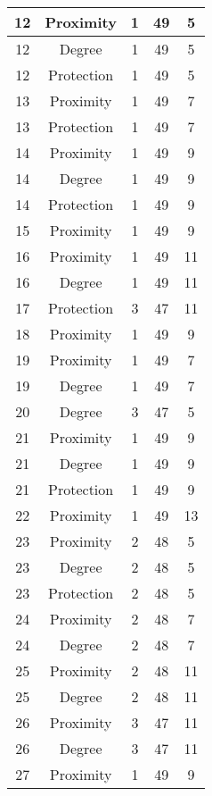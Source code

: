 \documentclass[results.tex]{subfiles}
\begin{document}
\begin{center}
\begin{tabular}{| c || c | c | c | c |}
    \hline
    12 & Proximity & 1 & 49 & 5 \\ 
    \hline
    12 & Degree & 1 & 49 & 5 \\ 
    \hline
    12 & Protection & 1 & 49 & 5 \\ 
    \hline
    13 & Proximity & 1 & 49 & 7 \\ 
    \hline
    13 & Protection & 1 & 49 & 7 \\ 
    \hline
    14 & Proximity & 1 & 49 & 9 \\ 
    \hline
    14 & Degree & 1 & 49 & 9 \\ 
    \hline
    14 & Protection & 1 & 49 & 9 \\ 
    \hline
    15 & Proximity & 1 & 49 & 9 \\ 
    \hline
    16 & Proximity & 1 & 49 & 11 \\ 
    \hline
    16 & Degree & 1 & 49 & 11 \\ 
    \hline
    17 & Protection & 3 & 47 & 11 \\ 
    \hline
    18 & Proximity & 1 & 49 & 9 \\ 
    \hline
    19 & Proximity & 1 & 49 & 7 \\ 
    \hline
    19 & Degree & 1 & 49 & 7 \\ 
    \hline
    20 & Degree & 3 & 47 & 5 \\ 
    \hline
    21 & Proximity & 1 & 49 & 9 \\ 
    \hline
    21 & Degree & 1 & 49 & 9 \\ 
    \hline
    21 & Protection & 1 & 49 & 9 \\ 
    \hline
    22 & Proximity & 1 & 49 & 13 \\ 
    \hline
    23 & Proximity & 2 & 48 & 5 \\ 
    \hline
    23 & Degree & 2 & 48 & 5 \\ 
    \hline
    23 & Protection & 2 & 48 & 5 \\ 
    \hline
    24 & Proximity & 2 & 48 & 7 \\ 
    \hline
    24 & Degree & 2 & 48 & 7 \\ 
    \hline
    25 & Proximity & 2 & 48 & 11 \\ 
    \hline
    25 & Degree & 2 & 48 & 11 \\ 
    \hline
    26 & Proximity & 3 & 47 & 11 \\ 
    \hline
    26 & Degree & 3 & 47 & 11 \\ 
    \hline
    27 & Proximity & 1 & 49 & 9 \\ 
    \hline

\end{tabular}
\end{center}
\end{document}

